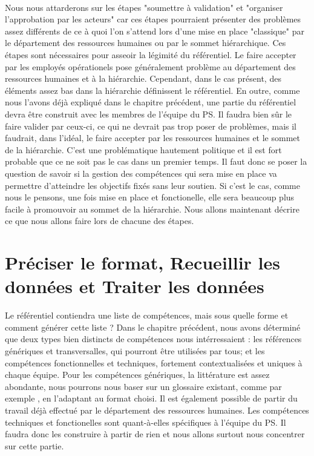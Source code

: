 \paragraph{} Nous nous attarderons sur les étapes "soumettre à validation" et "organiser l'approbation par les acteurs" car ces étapes pourraient présenter des problèmes assez différents de ce à quoi l'on s'attend lors d'une mise en place "classique" par le département des ressources humaines ou par le sommet hiérarchique. 
Ces étapes sont nécessaires pour asseoir la légimité du référentiel. Le faire accepter par les employés opérationels pose généralement problème au département des ressources humaines et à la hiérarchie. Cependant, dans le cas présent, des éléments assez bas dans la hiérarchie définissent le référentiel. En outre, comme nous l'avons déjà expliqué dans le chapitre précédent, une partie du référentiel devra être construit avec les membres de l'équipe du PS. Il faudra bien sûr le faire valider par ceux-ci, ce qui ne devrait pas trop poser de problèmes, mais il faudrait, dans l'idéal, le faire accepter par les ressources humaines et le sommet de la hiérarchie. C'est une problématique hautement politique et il est fort probable que ce ne soit pas le cas dans un premier temps. Il faut donc se poser la question de savoir si la gestion des compétences qui sera mise en place va permettre d'atteindre les objectifs fixés sans leur soutien. Si c'est le cas, comme nous le pensons, une fois mise en place et fonctionelle, elle sera beaucoup plus facile à promouvoir au sommet de la hiérarchie. Nous allons maintenant décrire ce que nous allons faire lors de chacune des étapes. 

\section{Préciser le format, Recueillir les données et Traiter les données}
Le référentiel contiendra une liste de compétences, mais sous quelle forme et comment générer cette liste ? Dans le chapitre précédent, nous avons déterminé que deux types bien distincts de compétences nous intérressaient : les références génériques et transversalles, qui pourront être utilisées par tous; et les compétences fonctionnelles et techniques, fortement contextualisées et uniques à chaque équipe. Pour les compétences génériques, la littérature est assez abondante, nous pourrons nous baser sur un glossaire existant, comme par exemple \citep{exemple_ref}, en l'adaptant au format choisi. Il est également possible de partir du travail déjà effectué par le département des ressources humaines. Les compétences techniques et fonctionelles sont quant-à-elles spécifiques à l'équipe du PS. Il faudra donc les construire à partir de rien et nous allons surtout nous concentrer sur cette partie. 

